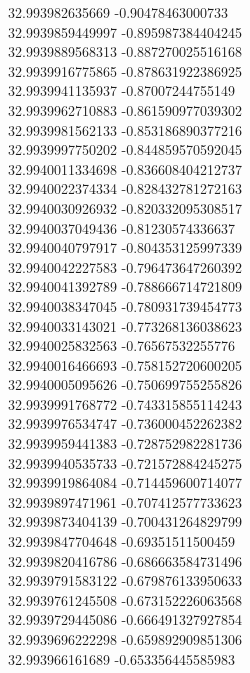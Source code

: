 {32.993982635669	-0.90478463000733\\
32.9939859449997	-0.895987384404245\\
32.9939889568313	-0.887270025516168\\
32.9939916775865	-0.878631922386925\\
32.9939941135937	-0.87007244755149\\
32.9939962710883	-0.861590977039302\\
32.9939981562133	-0.853186890377216\\
32.9939997750202	-0.844859570592045\\
32.9940011334698	-0.836608404212737\\
32.9940022374334	-0.828432781272163\\
32.9940030926932	-0.820332095308517\\
32.9940037049436	-0.81230574336637\\
32.9940040797917	-0.804353125997339\\
32.9940042227583	-0.796473647260392\\
32.9940041392789	-0.788666714721809\\
32.9940038347045	-0.780931739454773\\
32.9940033143021	-0.773268136038623\\
32.9940025832563	-0.76567532255776\\
32.9940016466693	-0.758152720600205\\
32.9940005095626	-0.750699755255826\\
32.9939991768772	-0.743315855114243\\
32.9939976534747	-0.736000452262382\\
32.9939959441383	-0.728752982281736\\
32.9939940535733	-0.721572884245275\\
32.9939919864084	-0.714459600714077\\
32.9939897471961	-0.707412577733623\\
32.9939873404139	-0.700431264829799\\
32.9939847704648	-0.69351511500459\\
32.9939820416786	-0.686663584731496\\
32.9939791583122	-0.679876133950633\\
32.9939761245508	-0.673152226063568\\
32.9939729445086	-0.666491327927854\\
32.9939696222298	-0.659892909851306\\
32.993966161689	-0.653356445585983\\
}
